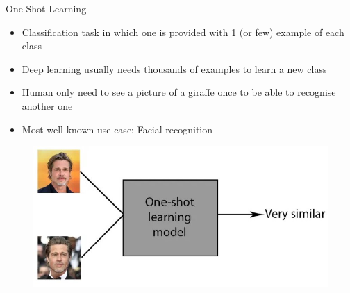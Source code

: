 \begin{frame}{One Shot Learning}

\begin{itemize}
    \item Classification task in which one is provided with 1 (or few) example of each class
    \item Deep learning usually needs thousands of examples to learn a new class
    \item Human only need to see a picture of a giraffe once to be able to recognise another one
    \item Most well known use case: Facial recognition
\end{itemize}    
\begin{figure}
    \centering
    \includegraphics[scale=0.4]{images/imagerecog.jpg}
\end{figure}

\end{frame}


